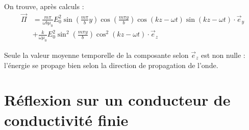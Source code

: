 \documentclass{report}
\begin{document}
\begin{itemize}
	On trouve, après calculs :
	\begin{align*}
		\vec{\Pi}&=\frac{m\pi}{\omega b\mu_0}E_0^2\sin\left(\frac{m\pi}{b}y\right)\cos\left(\frac{m\pi y}{b}\right)\cos(kz-\omega t)\sin(kz-\omega t)\cdot\vec{e}_y \\
		&+\frac{k}{\omega\mu_0}E_0^2\sin^2\left(\frac{m\pi y}{b}\right)\cos^2(kz-\omega t)\cdot\vec{e}_z
	\end{align*}
	
	Seule la valeur moyenne temporelle de la composante selon 	$\vec{e}_z$ est non nulle : l'énergie se propage bien selon la direction de propagation de l'onde.
	
\end{itemize}

\section*{Réflexion sur un conducteur de conductivité finie}
\end{document}
